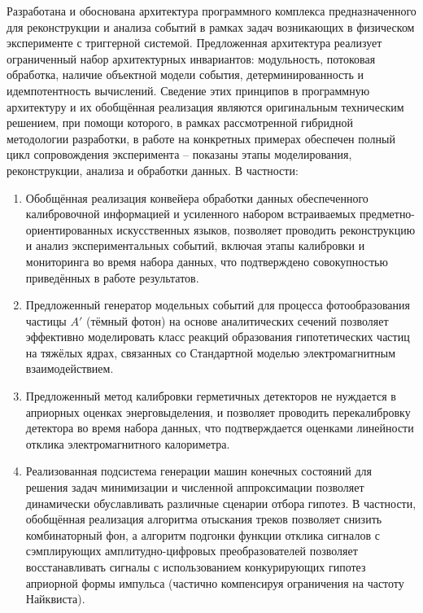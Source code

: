 Разработана и обоснована архитектура программного комплекса
предназначенного для реконструкции и анализа событий в
рамках задач возникающих в физическом эксперименте с триггерной
системой.
Предложенная архитектура реализует ограниченный набор
архитектурных инвариантов:
модульность,
потоковая обработка,
наличие объектной модели события,
детерминированность и идемпотентность вычислений.
Сведение этих принципов в программную архитектуру и их
обобщённая реализация являются оригинальным техническим
решением, при помощи которого, в рамках рассмотренной гибридной методологии
разработки, в работе на конкретных
примерах обеспечен полный цикл сопровождения эксперимента -- показаны этапы
моделирования, реконструкции, анализа и обработки данных. В частности:
\begin{enumerate}
    \item Обобщённая реализация конвейера обработки данных обеспеченного
    калибровочной информацией и усиленного набором встраиваемых
    предметно-ориентированных
    искусственных языков, позволяет проводить реконструкцию
    и анализ экспериментальных событий, включая этапы калибровки и
    мониторинга во время набора данных, что подтверждено совокупностью
    приведённых в работе результатов.
    \item Предложенный генератор модельных событий для процесса
    фотообразования частицы $A'$ (тёмный фотон) на основе аналитических
    сечений позволяет эффективно моделировать
    класс реакций образования гипотетических частиц на тяжёлых ядрах,
    связанных со Стандартной моделью электромагнитным взаимодействием.
    \item Предложенный метод калибровки герметичных детекторов не
    нуждается в априорных оценках энерговыделения, и позволяет проводить
    перекалибровку детектора во время набора данных, что
    подтверждается оценками линейности отклика электромагнитного
    калориметра.
    \item Реализованная подсистема генерации машин конечных состояний для
    решения задач минимизации и численной аппроксимации позволяет динамически
    обуславливать различные сценарии отбора гипотез. В частности, обобщённая
    реализация алгоритма отыскания треков позволяет снизить комбинаторный фон,
    а алгоритм подгонки функции отклика сигналов с сэмплирующих
    амплитудно-цифровых преобразователей позволяет восстанавливать сигналы
    с использованием конкурирующих гипотез априорной формы
    импульса (частично компенсируя ограничения на частоту Найквиста).
\end{enumerate}

